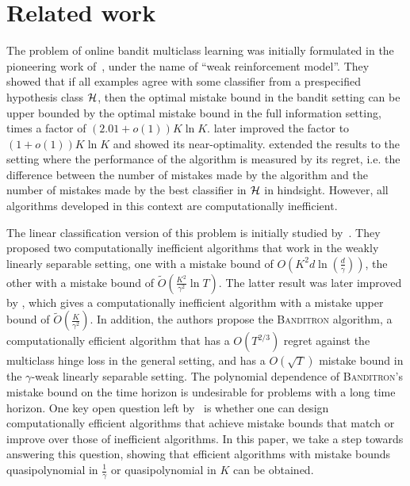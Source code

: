 \section{Related work}
\label{section:related-work}

The problem of online bandit multiclass learning was initially formulated in the
pioneering work of~\citet{Auer-Long-1999}, under the name of ``weak
reinforcement model''. They showed that if all examples agree with some
classifier from a prespecified hypothesis class $\mathcal{H}$, then the optimal
mistake bound in the bandit setting can be upper bounded by the optimal mistake
bound in the full information setting, times a factor of $(2.01 + o(1))K \ln K$.
\citet{Long-2017} later improved the factor to $(1 + o(1)) K \ln K$ and showed
its near-optimality. \citet{Daniely-Helbertal-2013} extended the results to the
setting where the performance of the algorithm is measured by its regret, i.e.
the difference between the number of mistakes made by the algorithm and the
number of mistakes made by the best classifier in $\mathcal{H}$ in hindsight. However,
all algorithms developed in this context are computationally inefficient.

The linear classification version of this problem is initially studied
by~\citet{Kakade-Shalev-Shwartz-Tewari-2008}. They proposed two computationally
inefficient algorithms that work in the weakly linearly separable setting, one
with a mistake bound of $O(K^2 d \ln(\frac{d}{\gamma}))$, the other with a
mistake bound of $\widetilde{O}(\frac{K^2}{\gamma^2} \ln T)$. The latter result
was later improved by \citet{Daniely-Helbertal-2013}, which gives a
computationally inefficient algorithm with a mistake upper bound of
$\widetilde{O}(\frac{K}{\gamma^2})$. In addition, the authors propose the
\textsc{Banditron} algorithm, a computationally efficient algorithm that has a
$O(T^{2/3})$ regret against the multiclass hinge loss in the general setting,
and has a $O(\sqrt{T})$ mistake bound in the $\gamma$-weak linearly separable
setting. The polynomial dependence of \textsc{Banditron}'s mistake bound on the
time horizon is undesirable for problems with a long time horizon. One key open
question left by~\citet{Kakade-Shalev-Shwartz-Tewari-2008} is whether one can
design computationally efficient algorithms that achieve mistake bounds that
match or improve over those of inefficient algorithms. In this paper, we take a
step towards answering this question, showing that efficient algorithms with
mistake bounds quasipolynomial in $\frac 1 \gamma$ or quasipolynomial in $K$ can
be obtained.

